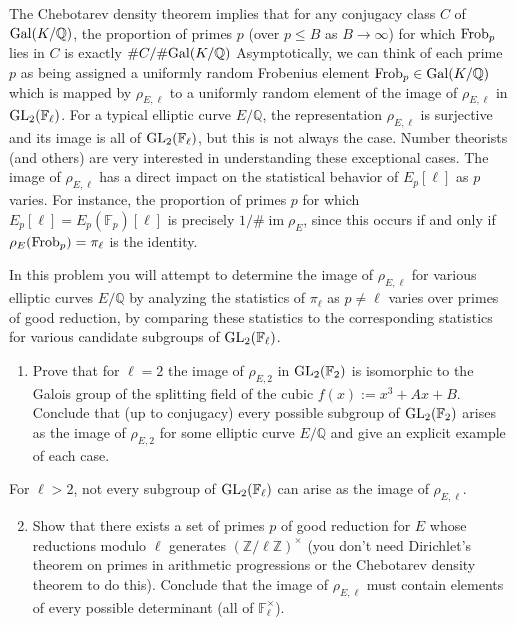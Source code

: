 \documentclass[11pt]{article}
\newcommand{\Fl}{\mathbb{F}_\ell}
\newcommand{\Fp}{\mathbb{F}_p}
\newcommand{\FF}{\mathbb{F}}
\newcommand{\Q}{\mathbb{Q}}
\newcommand{\Z}{\mathbb{Z}}
\newcommand{\Gal}{{\rm Gal}}
\newcommand{\GL}{{\rm GL}}
\newcommand{\Frob}{{\rm Frob}}
\newcommand{\im}{\operatorname{im}}
\theoremstyle{definition}
\begin{document}
The Chebotarev density theorem implies that for any conjugacy class $C$ of $\Gal(K/\Q)$, the proportion of primes $p$ (over $p\le B$ as $B\to\infty$) for which $\Frob_p$ lies in $C$ is exactly  $\#C/\#\Gal(K/\Q)$
Asymptotically, we can think of each prime $p$ as being assigned a uniformly random Frobenius element $\Frob_p\in\Gal(K/\Q)$ which is mapped by $\rho_{E,\ell}$ to a uniformly random element of the image of $\rho_{E,\ell}$ in $\GL_2(\Fl)$.
For a typical elliptic curve $E/\Q$, the representation $\rho_{E,\ell}$ is surjective and its image is all of $\GL_2(\Fl)$, but this is not always the case.
Number theorists (and others) are very interested in understanding these exceptional cases.
The image of $\rho_{E,\ell}$ has a direct impact on the statistical behavior of $E_p[\ell]$ as $p$ varies.
For instance, the proportion of primes $p$ for which $E_p[\ell] = E_p(\Fp)[\ell]$ is precisely $1/\#\im \rho_E$, since this occurs if and only if $\rho_E(\Frob_p)=\pi_\ell$ is the identity.

In this problem you will attempt to determine the image of $\rho_{E,\ell}$ for various elliptic curves $E/\Q$ by analyzing the statistics of $\pi_\ell$ as $p\ne \ell$ varies over primes of good reduction, by comparing these statistics to the corresponding statistics for various candidate subgroups of $\GL_2(\Fl)$.

\begin{enumerate}[{\bf(a)}]
\item Prove that for $\ell=2$ the image of $\rho_{E,2}$ in $\GL_2(\FF_2)$ is isomorphic to the Galois group of the splitting field of the cubic $f(x):=x^3+Ax+B$.
Conclude that (up to conjugacy) every possible subgroup of $\GL_2(\FF_2)$ arises as the image of $\rho_{E,2}$ for some elliptic curve $E/\Q$ and give an explicit example of each case.
\end{enumerate}

\noindent
For $\ell > 2$, not every subgroup of $\GL_2(\Fl)$ can arise as the image of $\rho_{E,\ell}$.

\begin{enumerate}[{\bf(a)}]
\setcounter{enumi}{1}
\item Show that there exists a set of primes $p$ of good reduction for $E$ whose reductions modulo $\ell$ generates $(\Z/\ell\Z)^\times$ (you don't need Dirichlet's theorem on primes in arithmetic progressions or the Chebotarev density theorem to do this).
Conclude that the image of $\rho_{E,\ell}$ must contain elements of every possible determinant (all of $\Fl^\times$).
\end{enumerate}
\end{document}
